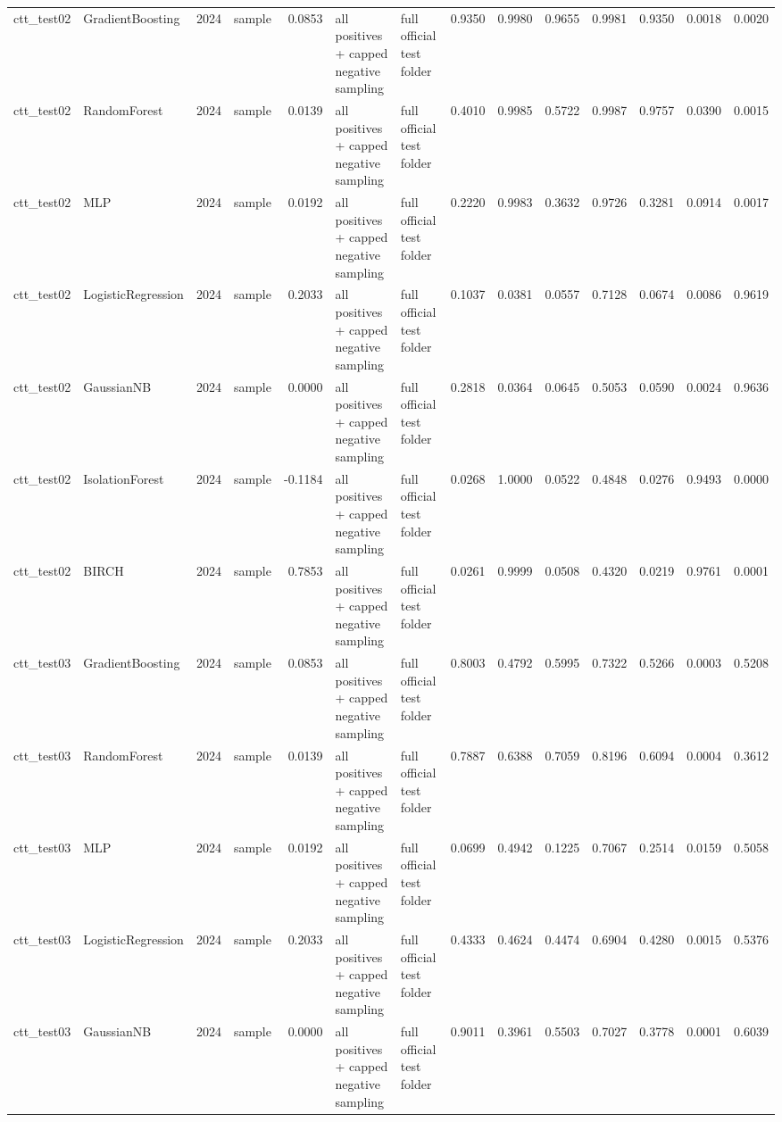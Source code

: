 \begin{tabular}{llrlrllrrrrrrr}
ctt\_test02 & GradientBoosting & 2024 & sample & 0.0853 & all positives + capped negative sampling & full official test folder & 0.9350 & 0.9980 & 0.9655 & 0.9981 & 0.9350 & 0.0018 & 0.0020 \\
ctt\_test02 & RandomForest & 2024 & sample & 0.0139 & all positives + capped negative sampling & full official test folder & 0.4010 & 0.9985 & 0.5722 & 0.9987 & 0.9757 & 0.0390 & 0.0015 \\
ctt\_test02 & MLP & 2024 & sample & 0.0192 & all positives + capped negative sampling & full official test folder & 0.2220 & 0.9983 & 0.3632 & 0.9726 & 0.3281 & 0.0914 & 0.0017 \\
ctt\_test02 & LogisticRegression & 2024 & sample & 0.2033 & all positives + capped negative sampling & full official test folder & 0.1037 & 0.0381 & 0.0557 & 0.7128 & 0.0674 & 0.0086 & 0.9619 \\
ctt\_test02 & GaussianNB & 2024 & sample & 0.0000 & all positives + capped negative sampling & full official test folder & 0.2818 & 0.0364 & 0.0645 & 0.5053 & 0.0590 & 0.0024 & 0.9636 \\
ctt\_test02 & IsolationForest & 2024 & sample & -0.1184 & all positives + capped negative sampling & full official test folder & 0.0268 & 1.0000 & 0.0522 & 0.4848 & 0.0276 & 0.9493 & 0.0000 \\
ctt\_test02 & BIRCH & 2024 & sample & 0.7853 & all positives + capped negative sampling & full official test folder & 0.0261 & 0.9999 & 0.0508 & 0.4320 & 0.0219 & 0.9761 & 0.0001 \\
ctt\_test03 & GradientBoosting & 2024 & sample & 0.0853 & all positives + capped negative sampling & full official test folder & 0.8003 & 0.4792 & 0.5995 & 0.7322 & 0.5266 & 0.0003 & 0.5208 \\
ctt\_test03 & RandomForest & 2024 & sample & 0.0139 & all positives + capped negative sampling & full official test folder & 0.7887 & 0.6388 & 0.7059 & 0.8196 & 0.6094 & 0.0004 & 0.3612 \\
ctt\_test03 & MLP & 2024 & sample & 0.0192 & all positives + capped negative sampling & full official test folder & 0.0699 & 0.4942 & 0.1225 & 0.7067 & 0.2514 & 0.0159 & 0.5058 \\
ctt\_test03 & LogisticRegression & 2024 & sample & 0.2033 & all positives + capped negative sampling & full official test folder & 0.4333 & 0.4624 & 0.4474 & 0.6904 & 0.4280 & 0.0015 & 0.5376 \\
ctt\_test03 & GaussianNB & 2024 & sample & 0.0000 & all positives + capped negative sampling & full official test folder & 0.9011 & 0.3961 & 0.5503 & 0.7027 & 0.3778 & 0.0001 & 0.6039 \\

\end{tabular}
